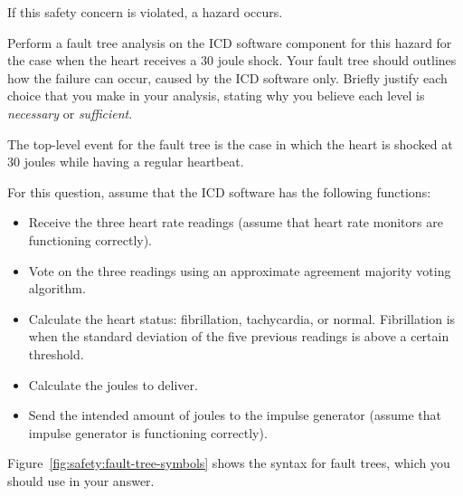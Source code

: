 If this safety concern is violated, a hazard occurs.

Perform a fault tree analysis on the ICD software component for this hazard for the case when the heart receives a 30 joule shock. Your fault tree should outlines how the failure can occur, caused by the ICD software only. Briefly justify each choice that you make in your analysis, stating why you believe each level is \emph{necessary} or \emph{sufficient}.

The top-level event for the fault tree is the case in which the heart is shocked at 30 joules while having a regular heartbeat.

For this question, assume that the ICD software has the following functions:

 \begin{itemize}
  \item Receive the three heart rate readings (assume that heart rate monitors are functioning correctly).
  \item Vote on the three readings using an approximate agreement majority voting algorithm.
  \item Calculate the heart status: fibrillation, tachycardia, or normal. Fibrillation is when the standard deviation of the five previous readings is above a certain threshold.
  \item Calculate the joules to deliver.
  \item Send the intended amount of joules to the impulse generator (assume that impulse generator is functioning correctly).
 \end{itemize}



Figure~\ref{fig:safety:fault-tree-symbols} shows the syntax for fault trees, which you should use in your answer. 


